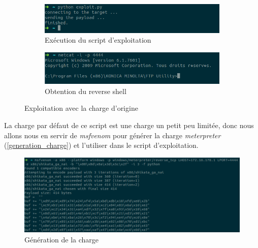     \begin{figure}[h!]
        \centering
        \begin{subfigure}{0.9\textwidth}
            \centering
            \includegraphics[width=\textwidth]{images/exploit_python.png}
            \caption{Exécution du script d'exploitation}
            \label{execution_script_exploitation}
        \end{subfigure}
        \hfill
        \begin{subfigure}{0.9\textwidth}
            \centering
            \includegraphics[width=\textwidth]{images/reverse_shell.png}
            \caption{Obtention du reverse shell}
            \label{obtention_reverse_shell}
        \end{subfigure}
        \hfill
        \caption{Exploitation avec la charge d'origine}
        \label{exploitation_avec_charge_origine}
    \end{figure}

    La charge par défaut de ce script est une charge un petit peu limitée, donc nous allons nous en servir 
    de \emph{msfvenom} pour générer la charge \emph{meterpreter} (\autoref{generation_charge}) et l'utiliser 
    dans le script d'exploitation.
    \begin{figure}[h]
        \centering
        \includegraphics[width=\linewidth]{images/msfvenom.png}
        \caption{Génération de la charge}
        \label{generation_charge}
    \end{figure}

